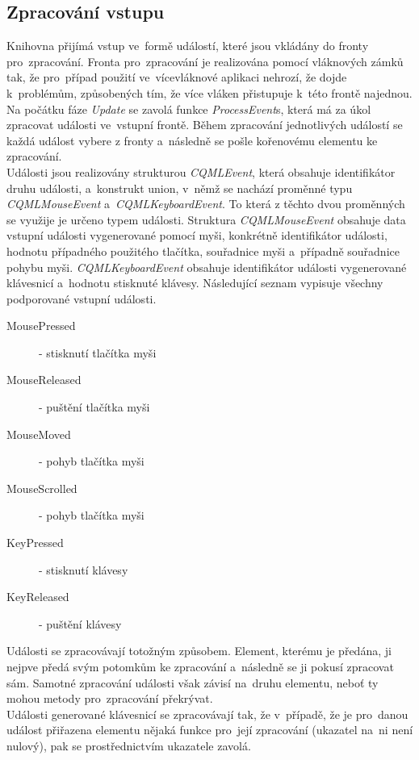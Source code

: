 \documentclass[11pt,twoside,a4paper]{book}
\begin{document}
\subsection{\label{sec:input}Zpracování vstupu}
Knihovna přijímá vstup ve~formě událostí, které jsou vkládány do fronty pro~zpracování. Fronta pro~zpracování je realizována pomocí vláknových zámků tak, že pro~případ použití ve~vícevláknové aplikaci nehrozí, že dojde k~problémům, způsobených tím, že více vláken přistupuje k~této frontě najednou.
Na počátku fáze \textit{Update} se zavolá funkce \textit{ProcessEvent}s, která má za úkol zpracovat události ve~vstupní frontě. Během zpracování jednotlivých událostí se každá událost vybere z fronty a~následně se pošle kořenovému elementu ke zpracování. \\
Události jsou realizovány strukturou \textit{CQMLEvent}, která obsahuje identifikátor druhu události, a~konstrukt union, v~němž se nachází proměnné typu \textit{CQMLMouseEvent} a~\textit{CQMLKeyboardEvent}. To která z těchto dvou proměnných se využije je určeno typem události. Struktura \textit{CQMLMouseEvent} obsahuje data vstupní události vygenerované pomocí myši, konkrétně identifikátor události, hodnotu případného použitého tlačítka, souřadnice myši a~případně souřadnice pohybu myši. \textit{CQMLKeyboardEvent} obsahuje identifikátor události vygenerované klávesnicí a~hodnotu stisknuté klávesy. Následující seznam vypisuje všechny podporované vstupní události.
\begin{description}
\item[MousePressed] - stisknutí tlačítka myši
\item[MouseReleased] - puštění tlačítka myši
\item[MouseMoved] - pohyb tlačítka myši
\item[MouseScrolled] - pohyb tlačítka myši
\item[KeyPressed] - stisknutí klávesy
\item[KeyReleased] - puštění klávesy
\end{description}
Události se zpracovávají totožným způsobem. Element, kterému je předána, ji nejpve předá svým potomkům ke zpracování a~následně se ji pokusí zpracovat sám. Samotné zpracování události však závisí na~druhu elementu, neboť ty mohou metody pro~zpracování překrývat. \\
Události generované klávesnicí se zpracovávají tak, že v~případě, že je pro~danou událost přiřazena elementu nějaká funkce pro~její zpracování (ukazatel na~ni není nulový), pak se prostřednictvím ukazatele zavolá.\\
\end{document}
